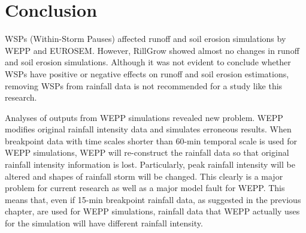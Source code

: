 \section{Conclusion}
\label{sec:InterStormPeriodsWithinAStormConclusion}

WSPs (Within-Storm Pauses) affected runoff and soil erosion simulations by WEPP
and EUROSEM. However, RillGrow showed almost no changes in runoff and soil
erosion simulations. Although it was not evident to conclude whether WSPs have
positive or negative effects on runoff and soil erosion estimations, removing
WSPs from rainfall data is not recommended for a study like this research.


Analyses of outputs from WEPP simulations revealed new problem. WEPP modifies
original rainfall intensity data and simulates erroneous results. When
breakpoint data with time scales shorter than 60-min temporal scale is used
for WEPP simulations, WEPP will re-construct the rainfall data so that original
rainfall intensity information is lost. Particularly, peak rainfall intensity
will be altered and shapes of rainfall storm will be changed. This clearly is a
major problem for current research as well as a major model fault for WEPP.
This means that, even if 15-min breakpoint rainfall data, as suggested
in the previous chapter, are used for WEPP simulations, rainfall data that WEPP
actually uses for the simulation will have different rainfall intensity.


%


